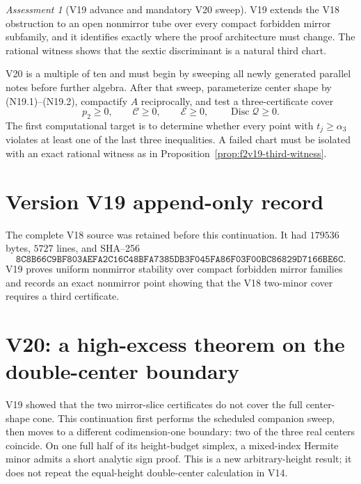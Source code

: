 \documentclass[11pt]{article}
\theoremstyle{definition}
\theoremstyle{remark}
\newtheorem{assessment}[theorem]{Assessment}
\begin{document}
\begin{assessment}[V19 advance and mandatory V20 sweep]
V19 extends the V18 obstruction to an open nonmirror tube over every compact
forbidden mirror subfamily, and it identifies exactly where the proof
architecture must change.  The rational witness shows that the sextic
discriminant is a natural third chart.

V20 is a multiple of ten and must begin by sweeping all newly generated
parallel notes before further algebra.  After that sweep, parameterize
center shape by \textup{(N19.1)}--\textup{(N19.2)}, compactify
\(A\) reciprocally, and test a three-certificate cover
\[
 p_2\geq0,\qquad
 \mathcal C\geq0,\qquad
 \mathcal E\geq0,\qquad
 \operatorname{Disc}\mathcal Q\geq0.
 \tag{N19.15}
\]
The first computational target is to determine whether every point with
\(t_j\geq\alpha_3\) violates at least one of the last three inequalities.
A failed chart must be isolated with an exact rational witness as in
Proposition~\ref{prop:f2v19-third-witness}.
\end{assessment}

\section*{Version V19 append-only record}
The complete V18 source was retained before this continuation.  It had
\(179536\) bytes, \(5727\) lines, and SHA--256
\[
 \texttt{8C8B66C9BF803AEFA2C16C48BFA7385DB3F045FA86F03F00BC86829D7166BE6C}.
\]
V19 proves uniform nonmirror stability over compact forbidden mirror
families and records an exact nonmirror point showing that the V18
two-minor cover requires a third certificate.



\section{V20: a high-excess theorem on the double-center boundary}
\label{sec:f2v20-double-center}

V19 showed that the two mirror-slice certificates do not cover the full
center-shape cone.  This continuation first performs the scheduled companion
sweep, then moves to a different codimension-one boundary: two of the three
real centers coincide.  On one full half of its height-budget simplex, a
mixed-index Hermite minor admits a short analytic sign proof.  This is a new
arbitrary-height result; it does not repeat the equal-height double-center
calculation in V14.
\end{document}
